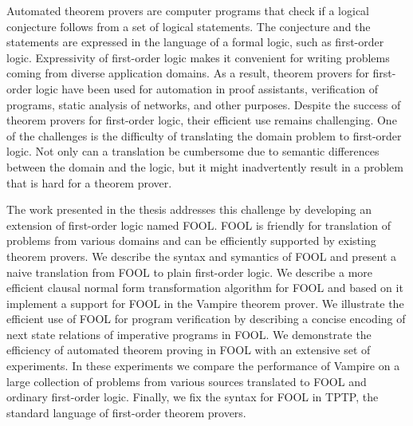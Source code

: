 Automated theorem provers are computer programs that check if a logical conjecture follows from a set of logical statements. The conjecture and the statements are expressed in the language of a formal logic, such as first-order logic. Expressivity of first-order logic makes it convenient for writing problems coming from diverse application domains. As a result, theorem provers for first-order logic have been used for automation in proof assistants, verification of programs, static analysis of networks, and other purposes. Despite the success of theorem provers for first-order logic, their efficient use remains challenging. One of the challenges is the difficulty of translating the domain problem to first-order logic. Not only can a translation be cumbersome due to semantic differences between the domain and the logic, but it might inadvertently result in a problem that is hard for a theorem prover.

The work presented in the thesis addresses this challenge by developing an extension of first-order logic named FOOL. FOOL is friendly for translation of problems from various domains and can be efficiently supported by existing theorem provers. We describe the syntax and symantics of FOOL and present a naive translation from FOOL to plain first-order logic. We describe a more efficient clausal normal form transformation algorithm for FOOL and based on it implement a support for FOOL in the Vampire theorem prover. We illustrate the efficient use of FOOL for program verification by describing a concise encoding of next state relations of imperative programs in FOOL. We demonstrate the efficiency of automated theorem proving in FOOL with an extensive set of experiments. In these experiments we compare the performance of Vampire on a large collection of problems from various sources translated to FOOL and ordinary first-order logic. Finally, we fix the syntax for FOOL in TPTP, the standard language of first-order theorem provers.